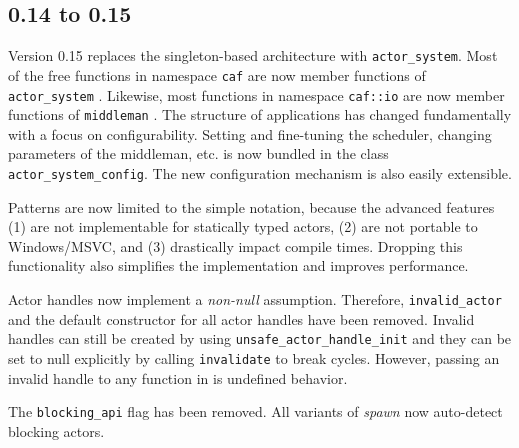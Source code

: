 \clearpage
\subsection{0.14 to 0.15}

Version 0.15 replaces the singleton-based architecture with \lstinline^actor_system^. Most of the free functions in namespace \lstinline^caf^ are now member functions of \lstinline^actor_system^ . Likewise, most functions in namespace \lstinline^caf::io^ are now member functions of \lstinline^middleman^ . The structure of \lib applications has changed fundamentally with a focus on configurability. Setting and fine-tuning the scheduler, changing parameters of the middleman, etc. is now bundled in the class \lstinline^actor_system_config^. The new configuration mechanism is also easily extensible.

Patterns are now limited to the simple notation, because the advanced features (1) are not implementable for statically typed actors, (2) are not portable to Windows/MSVC, and (3) drastically impact compile times. Dropping this functionality also simplifies the implementation and improves performance.

Actor handles now implement a \emph{non-null} assumption. Therefore, \lstinline^invalid_actor^ and the default constructor for all actor handles have been removed. Invalid handles can still be created by using \lstinline^unsafe_actor_handle_init^ and they can be set to null explicitly by calling \lstinline^invalidate^ to break cycles. However, passing an invalid handle to any function in \lib is undefined behavior.

The \lstinline^blocking_api^ flag has been removed. All variants of \emph{spawn} now auto-detect blocking actors.
